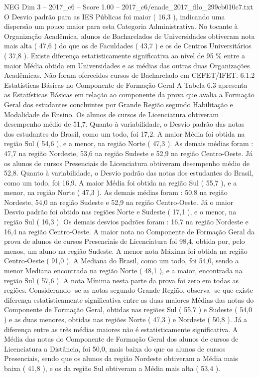 \begin{textsample}{NEG Dim 3 – 2017\_c6 – Score 1.00 – 2017\_c6/enade\_2017\_filo\_299cb010c7.txt}
O Desvio padrão para as IES Públicas foi maior ( 16,3 ), indicando uma dispersão um pouco maior para esta Categoria Administrativa.
No tocante à Organização Acadêmica, alunos de Bacharelados de Universidades obtiveram nota mais alta ( 47,6 ) do que os de Faculdades ( 43,7 ) e os de Centros Universitários ( 37,8 ).
Existe diferença estatisticamente significativa ao nível de 95 \% entre a maior Média obtida em Universidades e as médias das outras duas Organizações Acadêmicas.
Não foram oferecidos cursos de Bacharelado em CEFET/IFET. 6.1.2 Estatísticas Básicas no Componente de Formação Geral A Tabela 6.3 apresenta as Estatísticas Básicas em relação ao componente da prova que avalia a Formação Geral dos estudantes concluintes por Grande Região segundo Habilitação e Modalidade de Ensino.
Os alunos de cursos de Licenciatura obtiveram desempenho médio de 51,7.
Quanto à variabilidade, o Desvio padrão das notas dos estudantes do Brasil, como um todo, foi 17,2.
A maior Média foi obtida na região Sul ( 54,6 ), e a menor, na região Norte ( 47,3 ).
As demais médias foram : 47,7 na região Nordeste, 53,6 na região Sudeste e 52,9 na região Centro-Oeste.
Já os alunos de cursos Presenciais de Licenciatura obtiveram desempenho médio de 52,8.
Quanto à variabilidade, o Desvio padrão das notas dos estudantes do Brasil, como um todo, foi 16,9.
A maior Média foi obtida na região Sul ( 55,7 ), e a menor, na região Norte ( 47,3 ).
As demais médias foram : 50,8 na região Nordeste, 54,0 na região Sudeste e 52,9 na região Centro-Oeste.
Já o maior Desvio padrão foi obtido nas regiões Norte e Sudeste ( 17,1 ), e o menor, na região Sul ( 16,3 ).
Os demais desvios padrões foram : 16,7 na região Nordeste e 16,4 na região Centro-Oeste.
A maior nota no Componente de Formação Geral da prova de alunos de cursos Presenciais de Licenciatura foi 98,4, obtida por, pelo menos, um aluno na região Sudeste.
A menor nota Máxima foi obtida na região Centro-Oeste ( 91,0 ).
A Mediana do Brasil, como um todo, foi 54,0, sendo a menor Mediana encontrada na região Norte ( 48,1 ), e a maior, encontrada na região Sul ( 57,6 ).
A nota Mínima nesta parte da prova foi zero em todas as regiões.
Considerando -se as notas segundo Grande Região, observa -se que existe diferença estatisticamente significativa entre as duas maiores Médias das notas do Componente de Formação Geral, obtidas nas regiões Sul ( 55,7 ) e Sudeste ( 54,0 ) e as duas menores, obtidas nas regiões Norte ( 47,3 ) e Nordeste ( 50,8 ).
Já a diferença entre as três médias maiores não é estatisticamente significativa.
A Média das notas do Componente de Formação Geral dos alunos de cursos de Licenciatura a Distância, foi 50,0, mais baixa do que os alunos de cursos Presenciais, sendo que os alunos da região Nordeste obtiveram a Média mais baixa ( 41,8 ), e os da região Sul obtiveram a Média mais alta ( 53,4 ).

\end{textsample}
